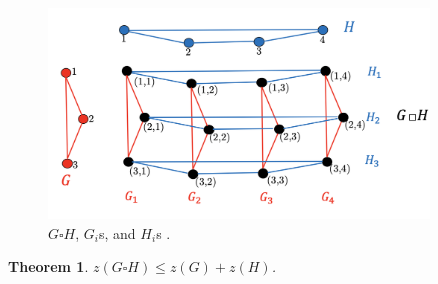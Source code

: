 \documentclass[1p]{elsarticle}
\newtheorem{theorem}{Theorem}
\begin{document}
\begin{figure}[h!]
	\centering
	\includegraphics[width=0.9\textwidth]{fig/cp3.png}
	\caption{$G \square H$, $G_i$s, and $H_i$s .}
	\label{fig:p1}
\end{figure}









\begin{theorem}
	$z(G \square H) \leq z(G) + z(H)$.
\end{theorem}
\end{document}
